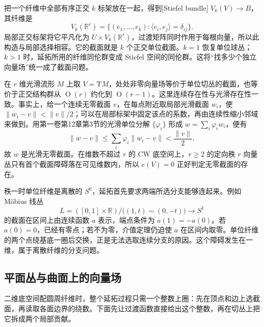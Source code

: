\ProseParagraphBreak

把一个纤维中全部有序正交 \(k\) 标架放在一起，得到[Stiefel bundle] \(V_k(V)\rightarrow B\)，其纤维是
\[
	V_k(\mathbb R^r)=\{(e_1,\ldots,e_k):\langle e_i,e_j\rangle=\delta_{ij}\}.
\]
局部正交标架将它平凡化为 \(U\times V_k(\mathbb R^r)\)，过渡矩阵同时作用于每根向量，所以此构造与局部选择相容。它的截面就是 \(k\) 个正交单位截面。\(k=1\) 恢复单位球丛；\(k>1\) 时，延拓所用的纤维同伦群变成 Stiefel 空间的同伦群。这将“找多少个独立向量场”统一成了截面问题。

\ProseParagraphBreak

在 \(r\) 维光滑流形 \(M\) 上取 \(V=\mathrm TM\)，处处非零向量场等价于单位切丛的截面，也等价于正交结构群从 \(\operatorname O(r)\) 约化到 \(\operatorname O(r-1)\)。这里连续存在性与光滑存在性一致。事实上，给一个连续无零截面 \(v\)，在每点附近取局部光滑截面 \(w_i\)，使 \(\|w_i-v\|<\|v\|/2\)；可以在局部标架中固定该点的系数，再由连续性缩小邻域来做到。用第一卷第12章第3节的光滑单位分解 \(\{\varphi_i\}\) 形成 \(w=\sum_i\varphi_iw_i\)，便有
\[
	\|w-v\|\le\sum_i\varphi_i\|w_i-v\|<\frac{\|v\|}{2},
\]
故 \(w\) 是光滑无零截面。在维数不超过 \(r\) 的 CW 底空间上，\(r\ge2\) 的定向秩 \(r\) 向量丛只有首个截面障碍落在可见维数内，所以 \(e(V)=0\) 正好判定无零截面的存在。

\ProseParagraphBreak

秩一时单位纤维是离散的 \(S^0\)，延拓首先要求两端所选分支能够连起来。例如 Möbius 线丛
\[
	L=([0,1]\times\mathbb R)/\bigl((1,t)\sim(0,-t)\bigr)\longrightarrow S^1
\]
的截面在区间上由连续函数 \(a\) 表示，端点条件为 \(a(1)=-a(0)\)。若 \(a(0)=0\)，已经有零点；若不为零，介值定理仍迫使 \(a\) 在区间内取零。单位纤维的两个点绕基底一圈后交换，正是无法选取连续分支的原因。这个障碍发生在一维，属于离散纤维的分支问题。

\subsection{平面丛与曲面上的向量场}
\label{g2:subsec:1204:03}
二维底空间配圆周纤维时，整个延拓过程只需一个整数上圈：先在顶点和边上选截面，再读取各面边界的绕数。下面先让过渡函数直接给出这个整数，再在切丛上把它拆成两个局部贡献。

